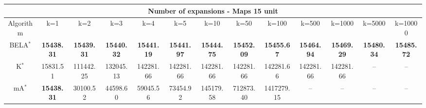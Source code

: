 \begin{tabular}{c|cccccccccccc}\toprule
\multicolumn{13}{c}{Number of expansions - Maps 15 unit}\\ \midrule
Algorithm & k=1 & k=2 & k=3 & k=4 & k=5 & k=10 & k=50 & k=100 & k=500 & k=1000 & k=5000 & k=10000 \\ \midrule
BELA$^*$ & \textbf{15438.31} & \textbf{15439.31} & \textbf{15440.32} & \textbf{15441.19} & \textbf{15441.97} & \textbf{15444.75} & \textbf{15452.09} & \textbf{15455.67} & \textbf{15464.94} & \textbf{15469.29} & \textbf{15480.34} & \textbf{15485.72} \\
K$^*$ & 15831.51 & 111442.25 & 132045.13 & 142281.66 & 142281.66 & 142281.66 & 142281.66 & 142281.66 & 142281.66 & 142281.66 & -- & -- \\
mA$^*$ & \textbf{15438.31} & 30100.52 & 44598.60 & 59045.56 & 73454.92 & 145179.58 & 712873.40 & 1417279.15 & -- & -- & -- & -- \\ \bottomrule 
\end{tabular}
